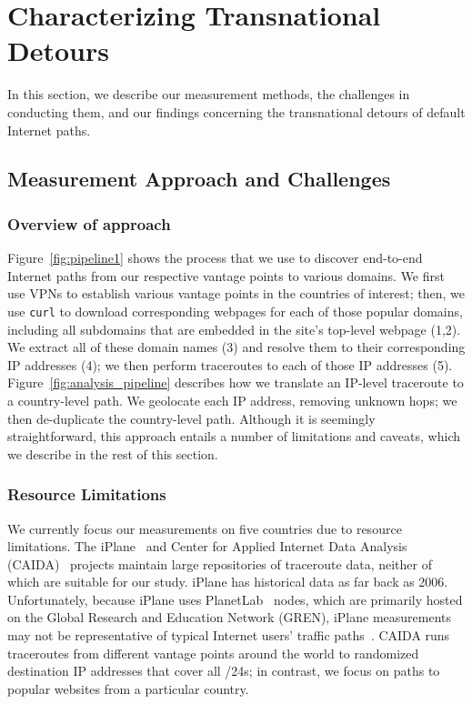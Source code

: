 \section{Characterizing Transnational Detours}
\label{datasets}
In this section, we describe our measurement methods, the challenges in
conducting them, and our findings concerning the transnational detours
of default Internet paths.

\subsection{Measurement Approach and Challenges}
\label{pipeline}

\subsubsection{Overview of approach}
Figure~\ref{fig:pipeline1} shows the process that we use to discover end-to-end
Internet paths from our respective vantage points to various domains. We first use
VPNs
to establish various vantage points in the countries of interest; then, we use 
{\tt curl} to download corresponding webpages for each of those popular domains,
including all subdomains that are embedded in the site's top-level webpage (1,2). We extract
all of these domain names (3) and resolve them to their corresponding IP addresses (4);
we then perform traceroutes to each of those IP addresses (5).
Figure~\ref{fig:analysis_pipeline} describes how we translate an IP-level traceroute
to a country-level path. We geolocate each IP address, removing unknown hops; we
then de-duplicate the country-level path. Although it is seemingly straightforward,
this approach entails a number of limitations and caveats, which we describe in
the
rest of this section.

\subsubsection{Resource Limitations}
\label{resource_limits}

We currently focus our measurements on five countries due to resource limitations.
The iPlane~\cite{madhyastha2006iplane} and Center for Applied Internet Data
Analysis (CAIDA)~\cite{caida} projects maintain large repositories of
traceroute data, neither of which are suitable for our study.   iPlane has
historical data as far back as 2006. Unfortunately, because iPlane uses
PlanetLab~\cite{PlanetLab} nodes, which are primarily hosted on the Global
Research and Education Network (GREN), iPlane measurements may not be
representative of typical Internet users' traffic
paths~\cite{banerjee2004interdomain}.  CAIDA runs traceroutes from different
vantage points around the world to randomized destination IP addresses that
cover all /24s; in contrast, we focus on paths to popular websites from a
particular country.

